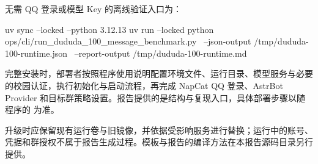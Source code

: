 无需 QQ 登录或模型 Key 的离线验证入口为：
\begin{Code}
uv sync --locked --python 3.12.13
uv run --locked python ops/cli/run_dududa_100_message_benchmark.py \
  --json-output /tmp/dududa-100-runtime.json \
  --report-output /tmp/dududa-100-runtime.md
\end{Code}

完整安装时，部署者按照程序使用说明配置环境文件、运行目录、模型服务与必要的校园认证，执行初始化与启动流程，再完成 NapCat QQ 登录、AstrBot Provider 和目标群策略设置。报告提供的是结构与复现入口，具体部署步骤以随程序的  为准。

升级时应保留现有运行卷与旧镜像，并依据受影响服务进行替换；运行中的账号、凭据和群授权不属于报告生成过程。模板与报告的编译方法在本报告源码目录另行提供。
